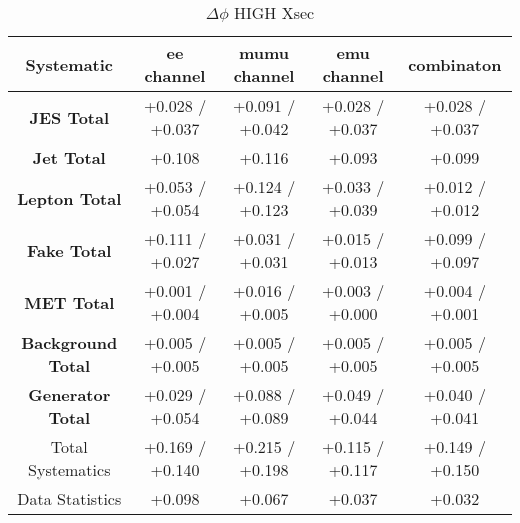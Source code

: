  \begin{table}[htbp]
\scriptsize
  \begin{center} 
  \begin{tabular}{|c|c|c|c|c|}
  \hline
   Systematic                            &  ee channel&  mumu channel&  emu channel&  combinaton\\
 \hline
\textbf{JES Total}                    &+0.028   / +0.037   & +0.091   / +0.042   & +0.028   / +0.037   & +0.028   / +0.037  \\
\textbf{Jet Total}                    &+0.108              & +0.116              & +0.093              & +0.099             \\
\textbf{Lepton Total}                 &+0.053   / +0.054   & +0.124   / +0.123   & +0.033   / +0.039   & +0.012   / +0.012  \\
\textbf{Fake Total}                   &+0.111   / +0.027   & +0.031   / +0.031   & +0.015   / +0.013   & +0.099   / +0.097  \\
\textbf{MET Total}                    &+0.001   / +0.004   & +0.016   / +0.005   & +0.003   / +0.000   & +0.004   / +0.001  \\
\textbf{Background Total}             &+0.005   / +0.005   & +0.005   / +0.005   & +0.005   / +0.005   & +0.005   / +0.005  \\
\textbf{Generator Total}              &+0.029   / +0.054   & +0.088   / +0.089   & +0.049   / +0.044   & +0.040   / +0.041  \\
  \hline
  \hline
Total Systematics                     &+0.169   / +0.140   & +0.215   / +0.198   & +0.115   / +0.117   & +0.149   / +0.150  \\
Data Statistics                       &+0.098              & +0.067              & +0.037              & +0.032             \\
  \hline
  \end{tabular}
  \end{center} 
  \label{tab:xsec_nominal_deltaPhi_high}
  \caption{$\Delta\phi$ HIGH Xsec}
\end{table}
 
